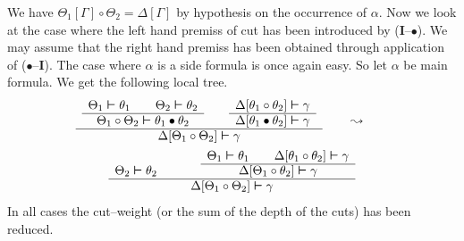We have $\Theta_1[\Gamma] \circ \Theta_2 = \Delta[\Gamma]$ by
hypothesis on the occurrence of $\alpha$. Now we look at the case
where the left hand premiss of cut has been introduced by
(\textbf{I}--$\bullet$). We may assume that the right hand premiss has
been obtained through application of ($\bullet$--\textbf{I}). The case
where $\alpha$ is a side formula is once again easy. So let
$\alpha$ be main formula. We get the following local tree.
\begin{multline}
\begin{array}{c}
\begin{array}{c}
\Theta_1 \bvdash \theta_1 \qquad \Theta_2 \bvdash \theta_2 \\\hline
\Theta_1 \circ \Theta_2 \bvdash \theta_1 \bullet \theta_2
\end{array}
        \qquad
\begin{array}{c}
\Delta[\theta_1 \circ \theta_2] \bvdash \gamma \\\hline
\Delta[\theta_1 \bullet \theta_2] \bvdash \gamma
\end{array}
        \\\hline
\Delta[\Theta_1 \circ \Theta_2] \bvdash \gamma
\end{array}
\qquad\leadsto\qquad \\
\begin{array}{ccc}
 & \qquad & \Theta_1 \bvdash \theta_1 \qquad
        \Delta[\theta_1 \circ \theta_2] \bvdash \gamma \\\cline{3-3}
\Theta_2 \bvdash \theta_2 & &
        \Delta[\Theta_1 \circ \theta_2] \bvdash \gamma \\\hline
\multicolumn{3}{c}{\Delta[\Theta_1 \circ \Theta_2] \bvdash \gamma}
\end{array}
\end{multline}
In all cases the cut--weight (or the sum of the depth of the 
cuts) has been reduced. 

